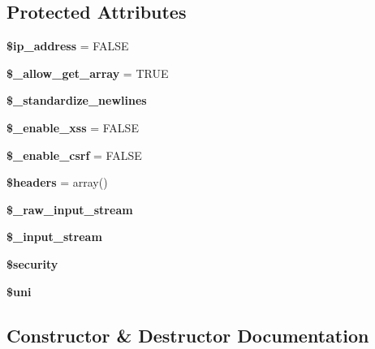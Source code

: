 \subsection*{Protected Attributes}
\begin{DoxyCompactItemize}
\item 
\mbox{\label{class_c_i___input_a9c10b56cd84ea00846350b9629189e49}} 
{\bfseries \$ip\+\_\+address} = F\+A\+L\+SE
\item 
\mbox{\label{class_c_i___input_aac5369bbd3452334df19501b8cb02af5}} 
{\bfseries \$\+\_\+allow\+\_\+get\+\_\+array} = T\+R\+UE
\item 
\mbox{\label{class_c_i___input_a134fd9ea9f1479a3456c679e1e71b198}} 
{\bfseries \$\+\_\+standardize\+\_\+newlines}
\item 
\mbox{\label{class_c_i___input_ae3747da3ff385212ddde28794107b5a0}} 
{\bfseries \$\+\_\+enable\+\_\+xss} = F\+A\+L\+SE
\item 
\mbox{\label{class_c_i___input_a8f57c8d48983e59af3d9232dd88836e5}} 
{\bfseries \$\+\_\+enable\+\_\+csrf} = F\+A\+L\+SE
\item 
\mbox{\label{class_c_i___input_a0acb57baa2bf4044b9dbcf9802087069}} 
{\bfseries \$headers} = array()
\item 
\mbox{\label{class_c_i___input_aee70f4f95d46b17c0fa8da35bbf87ef8}} 
{\bfseries \$\+\_\+raw\+\_\+input\+\_\+stream}
\item 
\mbox{\label{class_c_i___input_ae6912ed96715dc3ec8f10f1aecb1db39}} 
{\bfseries \$\+\_\+input\+\_\+stream}
\item 
\mbox{\label{class_c_i___input_a331dbe409a3bc56cbf5fe5a7b582a5ff}} 
{\bfseries \$security}
\item 
\mbox{\label{class_c_i___input_a4205d7ac270ae50ca29b1255c8dfeb2e}} 
{\bfseries \$uni}
\end{DoxyCompactItemize}


\subsection{Constructor \& Destructor Documentation}
\mbox{\label{class_c_i___input_a09ed00d5d4156941537b2bc5de39f6a8}} 
